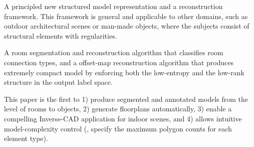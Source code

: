  A principled new structured
model representation and a reconstruction framework. This framework is
general and applicable to other domains, such as outdoor architectural
scenes or man-made objects,
where the subjects consist of structural elements with regularities.


 A room segmentation and
reconstruction algorithm that classifies room connection
types, and a offset-map reconstruction algorithm that produces extremely compact model by
enforcing both the low-entropy and the low-rank structure in the output
label space.

 This paper is the first to 1)
produce segmented and annotated models from the level of rooms to
objects, 2) generate floorplans automatically, 3) enable a compelling
Inverse-CAD application for indoor scenes, and 4) allows intuitive
model-complexity control (\eg, specify the maximum polygon counts for
each element type).










